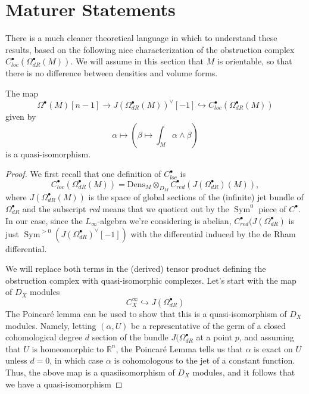 \documentclass[11pt]{amsart}
\newcommand{\mbb}{\mathbb}
\newcommand{\R}{\mbb R}
\DeclareMathOperator{\Sym}{Sym} \DeclareMathOperator{\Hom}{Hom}
\numberwithin{equation}{section}
\begin{document}
\section{Maturer Statements}
There is a much cleaner theoretical language in which to understand these results, based on the following nice characterization of the obstruction complex $C^\bullet_{loc}(\Omega^\bullet_{dR}(M))$. We will assume in this section that $M$ is orientable, so that there is no difference between densities and volume forms. 
\begin{lemma}
	\label{lem: qism}
	The map \[\Omega^\bullet(M) [n-1]\to J(\Omega^\bullet_{dR}(M))^\vee[-1] \hookrightarrow C^\bullet_{loc}(\Omega^\bullet_{dR}(M))\] given by
	\[
		\alpha \mapsto \left( \beta \mapsto \int_M \alpha \wedge \beta\right)
	\]
	is a quasi-isomorphism.
\end{lemma} 
\begin{proof}
We first recall that one definition of $C^\bullet_{loc}$ is
\[
C^\bullet_{loc}(\Omega^\bullet_{dR}(M)) = \text{Dens}_M\otimes_{D_M} C^\bullet_{red}(J(\Omega^\bullet_{dR})(M)),
\]	
where $J(\Omega^\bullet_{dR}(M))$ is the space of global sections of the (infinite) jet bundle of $\Omega^\bullet_{dR}$ and the subscript \textit{red} means that we quotient out by the $\Sym^0$ piece of $C^\bullet$. In our case, since the $L_\infty$-algebra we're considering is abelian, $C^\bullet_{red}(J(\Omega^\bullet_{dR})$ is just $\Sym^{>0}(J(\Omega^\bullet_{dR})^\vee[-1])$ with the differential induced by the de Rham differential. 

We will replace both terms in the (derived) tensor product defining the obstruction complex with quasi-isomorphic complexes. Let's start with the map of $D_X$ modules
\[
C^\infty_X \hookrightarrow J(\Omega^\bullet_{dR})
\]
The Poincar\'{e} lemma can be used to show that this is a quasi-isomorphism of $D_X$ modules. Namely, letting $(\alpha, U)$ be a representative of the germ of a closed cohomological degree $d$ section of the bundle $J(\Omega^\bullet_{dR}$ at a point $p$, and assuming that $U$ is homeomorphic to $\R^n$, the Poincar\'{e} Lemma tells us that $\alpha$ is exact on $U$ unless $d=0$, in which case $\alpha$ is cohomologous to the jet of a constant function. Thus, the above map is a quasiisomorphism of $D_X$ modules, and it follows that we have a quasi-isomorphism 
\end{proof}
\end{document}
